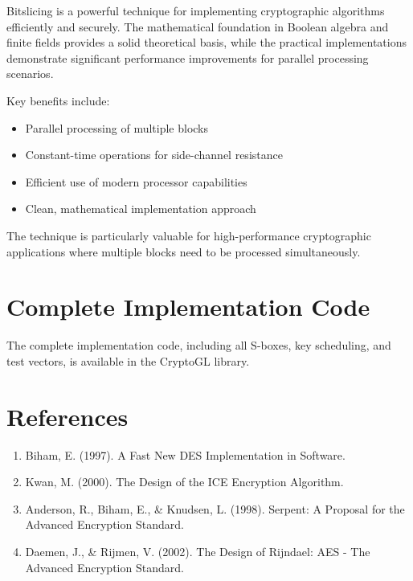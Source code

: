 \documentclass[11pt,a4paper]{article}
\begin{document}
Bitslicing is a powerful technique for implementing cryptographic algorithms efficiently and securely. The mathematical foundation in Boolean algebra and finite fields provides a solid theoretical basis, while the practical implementations demonstrate significant performance improvements for parallel processing scenarios.

Key benefits include:
\begin{itemize}
    \item Parallel processing of multiple blocks
    \item Constant-time operations for side-channel resistance
    \item Efficient use of modern processor capabilities
    \item Clean, mathematical implementation approach
\end{itemize}

The technique is particularly valuable for high-performance cryptographic applications where multiple blocks need to be processed simultaneously.

\appendix

\section{Complete Implementation Code}

The complete implementation code, including all S-boxes, key scheduling, and test vectors, is available in the CryptoGL library.

\section{References}

\begin{enumerate}
    \item Biham, E. (1997). A Fast New DES Implementation in Software.
    \item Kwan, M. (2000). The Design of the ICE Encryption Algorithm.
    \item Anderson, R., Biham, E., \& Knudsen, L. (1998). Serpent: A Proposal for the Advanced Encryption Standard.
    \item Daemen, J., \& Rijmen, V. (2002). The Design of Rijndael: AES - The Advanced Encryption Standard.
\end{enumerate}
\end{document}
